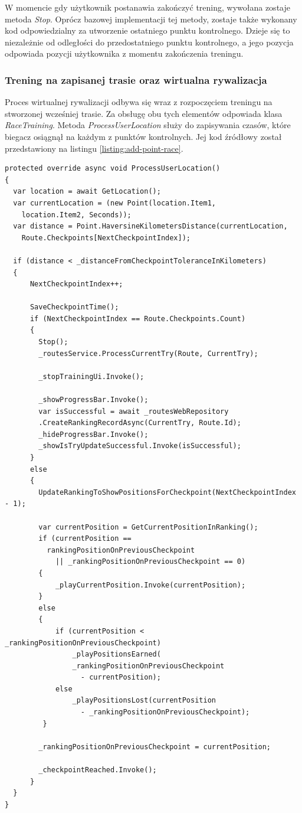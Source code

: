 W momencie gdy użytkownik postanawia zakończyć trening, wywołana zostaje metoda \textit{Stop}. Oprócz bazowej implementacji tej metody, zostaje także wykonany kod odpowiedzialny za utworzenie ostatniego punktu kontrolnego. Dzieje się to niezależnie od odległości do przedostatniego punktu kontrolnego, a jego pozycja odpowiada pozycji użytkownika z momentu zakończenia treningu.

\subsubsection{Trening na zapisanej trasie oraz wirtualna rywalizacja}
Proces wirtualnej rywalizacji odbywa się wraz z rozpoczęciem treningu na stworzonej wcześniej trasie. Za obsługę obu tych elementów odpowiada klasa \textit{RaceTraining}. Metoda \textit{ProcessUserLocation} służy do zapisywania czasów, które biegacz osiągnął na każdym z punktów kontrolnych. Jej kod źródłowy został przedstawiony na listingu \ref{listing:add-point-race}.
\begin{lstlisting}[caption={Proces wirtualnej rywalizacji},label=listing:add-point-race]
protected override async void ProcessUserLocation()
{
  var location = await GetLocation();
  var currentLocation = (new Point(location.Item1,
    location.Item2, Seconds));
  var distance = Point.HaversineKilometersDistance(currentLocation,
    Route.Checkpoints[NextCheckpointIndex]);

  if (distance < _distanceFromCheckpointToleranceInKilometers)
  {
      NextCheckpointIndex++;

      SaveCheckpointTime();
      if (NextCheckpointIndex == Route.Checkpoints.Count)
      {
        Stop();
        _routesService.ProcessCurrentTry(Route, CurrentTry);

        _stopTrainingUi.Invoke();

        _showProgressBar.Invoke();
        var isSuccessful = await _routesWebRepository
		.CreateRankingRecordAsync(CurrentTry, Route.Id);
        _hideProgressBar.Invoke();
        _showIsTryUpdateSuccessful.Invoke(isSuccessful);
      }
      else
      {
        UpdateRankingToShowPositionsForCheckpoint(NextCheckpointIndex - 1);

        var currentPosition = GetCurrentPositionInRanking();
        if (currentPosition == 
          rankingPositionOnPreviousCheckpoint
            || _rankingPositionOnPreviousCheckpoint == 0)
        {
            _playCurrentPosition.Invoke(currentPosition);
        }
        else
        {
            if (currentPosition < _rankingPositionOnPreviousCheckpoint)
                _playPositionsEarned(
                _rankingPositionOnPreviousCheckpoint
                  - currentPosition);
            else
                _playPositionsLost(currentPosition
                  - _rankingPositionOnPreviousCheckpoint);
         }

        _rankingPositionOnPreviousCheckpoint = currentPosition;

        _checkpointReached.Invoke();
      }
  }
}
\end{lstlisting}
